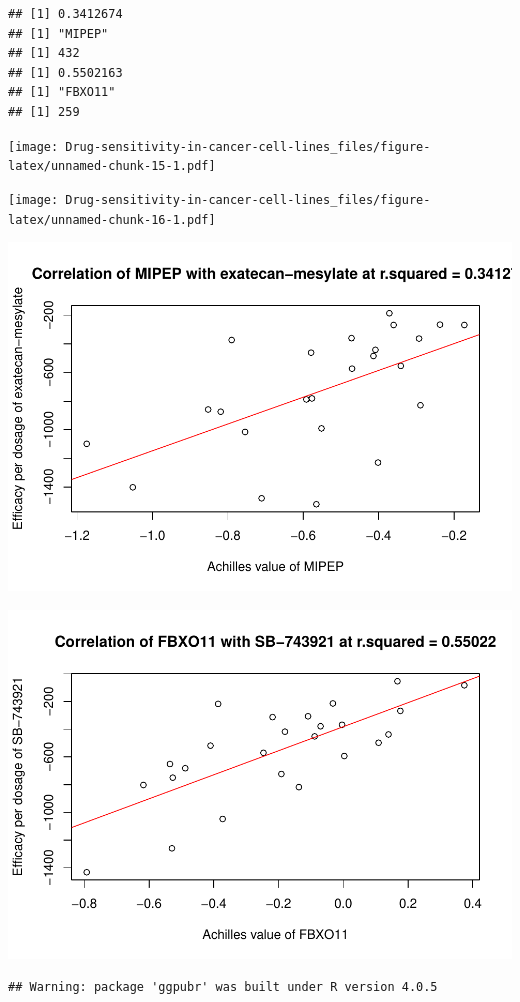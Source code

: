 \documentclass[
]{article}
\begin{document}
\begin{verbatim}
## [1] 0.3412674
## [1] "MIPEP"
## [1] 432
## [1] 0.5502163
## [1] "FBXO11"
## [1] 259
\end{verbatim}

\texttt{[image: Drug-sensitivity-in-cancer-cell-lines\_files/figure-latex/unnamed-chunk-15-1.pdf]}

\texttt{[image: Drug-sensitivity-in-cancer-cell-lines\_files/figure-latex/unnamed-chunk-16-1.pdf]}

\includegraphics{Drug-sensitivity-in-cancer-cell-lines_files/figure-latex/unnamed-chunk-17-1.pdf}

\includegraphics{Drug-sensitivity-in-cancer-cell-lines_files/figure-latex/unnamed-chunk-18-1.pdf}

\begin{verbatim}
## Warning: package 'ggpubr' was built under R version 4.0.5
\end{verbatim}
\end{document}
